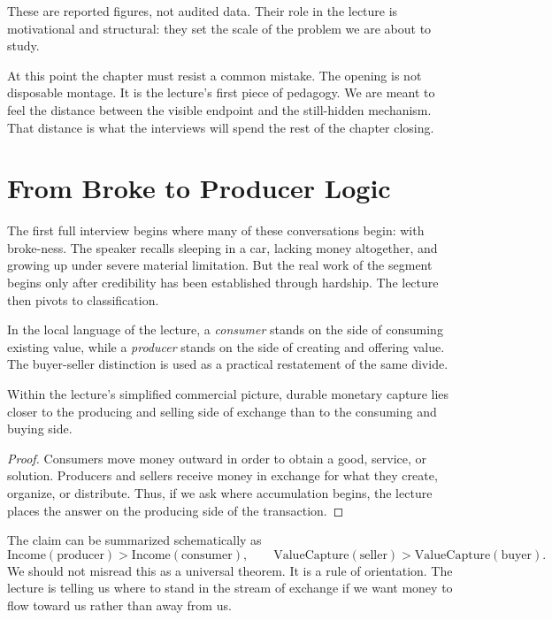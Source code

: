 \begin{remark}
These are reported figures, not audited data. Their role in the lecture is motivational and structural: they set the scale of the problem we are about to study.
\end{remark}

At this point the chapter must resist a common mistake. The opening is not disposable montage. It is the lecture's first piece of pedagogy. We are meant to feel the distance between the visible endpoint and the still-hidden mechanism. That distance is what the interviews will spend the rest of the chapter closing.

\section{From Broke to Producer Logic}

The first full interview begins where many of these conversations begin: with broke-ness. The speaker recalls sleeping in a car, lacking money altogether, and growing up under severe material limitation. But the real work of the segment begins only after credibility has been established through hardship. The lecture then pivots to classification.

\begin{definition}
In the local language of the lecture, a \emph{consumer} stands on the side of consuming existing value, while a \emph{producer} stands on the side of creating and offering value. The buyer-seller distinction is used as a practical restatement of the same divide.
\end{definition}

\begin{proposition}
Within the lecture's simplified commercial picture, durable monetary capture lies closer to the producing and selling side of exchange than to the consuming and buying side.
\end{proposition}

\begin{proof}
Consumers move money outward in order to obtain a good, service, or solution. Producers and sellers receive money in exchange for what they create, organize, or distribute. Thus, if we ask where accumulation begins, the lecture places the answer on the producing side of the transaction.
\end{proof}

The claim can be summarized schematically as
\begin{equation}
\mathrm{Income}(\text{producer}) > \mathrm{Income}(\text{consumer}),
\qquad
\mathrm{ValueCapture}(\text{seller}) > \mathrm{ValueCapture}(\text{buyer}).
\end{equation}
We should not misread this as a universal theorem. It is a rule of orientation. The lecture is telling us where to stand in the stream of exchange if we want money to flow toward us rather than away from us.

